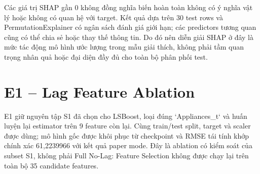 Các giá trị SHAP gần 0 không đồng nghĩa biến hoàn toàn không có ý nghĩa vật lý hoặc không có quan hệ với target. Kết quả dựa trên 30 test rows và Permutation\allowbreak Explainer có ngân sách đánh giá giới hạn; các predictors tương quan cũng có thể chia sẻ hoặc thay thế thông tin. Do đó nên diễn giải SHAP ở đây là mức tác động mô hình ước lượng trong mẫu giải thích, không phải tầm quan trọng nhân quả hoặc đại diện đầy đủ cho toàn bộ phân phối test.

\section{E1 -- Lag Feature Ablation}\label{e1-lag-feature-ablation}

E1 giữ nguyên tập S1 đã chọn cho LSBoost, loại đúng `Appliances\_t` và huấn luyện lại estimator trên 9 feature còn lại. Cùng train/test split, target và scaler được dùng; mô hình gốc được khôi phục từ checkpoint và RMSE tái tính khớp chính xác 61,2239966 với kết quả paper mode. Đây là ablation có kiểm soát của subset S1, không phải Full No-Lag: Feature Selection không được chạy lại trên toàn bộ 35 candidate features.

